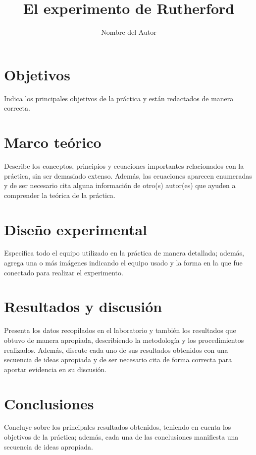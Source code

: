 \documentclass[twocolumn,a4paper,11pt]{scrartcl}
\title{El experimento de Rutherford}
\author{Nombre del Autor}
\date{}
\begin{document}

\section{Objetivos}
Indica los principales objetivos de la práctica y están redactados de manera correcta.

\section{Marco teórico}
Describe los conceptos, principios y ecuaciones importantes relacionados con la práctica, sin ser demasiado extenso. Además, las ecuaciones aparecen enumeradas y de ser necesario cita alguna información de otro(s) autor(es) que ayuden a comprender la teórica de la práctica.

\section{Diseño experimental}
Especifica todo el equipo utilizado en la práctica de manera detallada; además, agrega una o más imágenes indicando el equipo usado y la forma en la que fue conectado para realizar el experimento.

\section{Resultados y discusión}
Presenta los datos recopilados en el laboratorio y también los resultados que obtuvo de manera apropiada, describiendo la metodología y los procedimientos realizados. Además, discute cada uno de sus resultados obtenidos con una secuencia de ideas apropiada y de ser necesario cita de forma correcta para aportar evidencia en su discusión.


\section{Conclusiones}
Concluye sobre los principales resultados obtenidos, teniendo en cuenta los objetivos de la práctica; además, cada una de las conclusiones manifiesta una secuencia de ideas apropiada.


\end{document}
